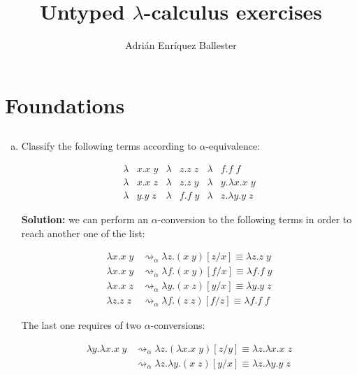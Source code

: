 \documentclass{article}
\title{Untyped $\lambda$-calculus exercises}
\author{Adrián Enríquez Ballester}
\begin{document}
\maketitle
\section*{Foundations}

\subsection{}\label{ex:1}

\begin{enumerate}[a)]
  \item Classify the following terms according to 
    $\alpha$-equivalence:

    \begin{align*}
  \lambda& x.x\;y & \lambda& z.z\;z & \lambda& f.f\;f           \\
  \lambda& x.x\;z & \lambda& z.z\;y & \lambda& y.\lambda x.x\;y \\
  \lambda& y.y\;z & \lambda& f.f\;y & \lambda& z.\lambda y.y\;z
    \end{align*}

    \textbf{Solution:} we can perform an $\alpha$-conversion to 
    the following terms in order to reach another one of the list:

    \begin{align*}
      \lambda x.x\;y 
        &\rightsquigarrow_\alpha \lambda z.(x\;y)[z/x] 
        \equiv \lambda z.z\;y \\
      \lambda x.x\;y 
        &\rightsquigarrow_\alpha \lambda f.(x\;y)[f/x] 
        \equiv \lambda f.f\;y \\
      \lambda x.x\;z 
        &\rightsquigarrow_\alpha \lambda y.(x\;z)[y/x] 
        \equiv \lambda y.y\;z \\ 
      \lambda z.z\;z 
        &\rightsquigarrow_\alpha \lambda f.(z\;z)[f/z] 
        \equiv \lambda f.f\;f
    \end{align*}

    The last one requires of two $\alpha$-conversions:

    \begin{align*}
      \lambda y.\lambda x.x\;y 
        &\rightsquigarrow_\alpha \lambda z.(\lambda x.x\;y)[z/y] 
        \equiv \lambda z.\lambda x.x\;z \\
        &\rightsquigarrow_\alpha \lambda z.\lambda y.(x\;z)[y/x] 
        \equiv \lambda z.\lambda y.y\;z
    \end{align*}


\end{enumerate}
\end{document}
